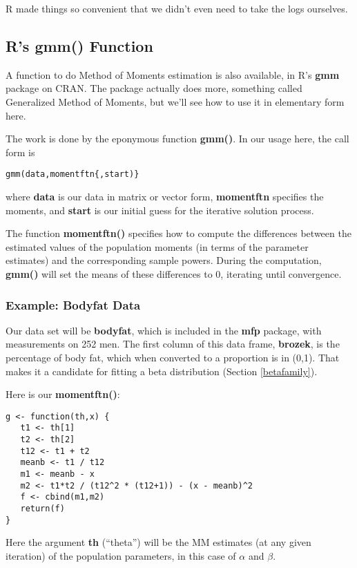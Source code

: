 R made things so convenient that we didn't even need to take the logs
ourselves.

\subsection{R's gmm() Function}

A function to do Method of Moments estimation is also available, in R's
{\bf gmm} package on CRAN.  The package actually does more, something
called Generalized Method of Moments, but we'll see how to use it in
elementary form here.

The work is done by the eponymous function {\bf gmm()}.  In our usage
here, the call form is

\begin{lstlisting}
gmm(data,momentftn{,start)}
\end{lstlisting}

where {\bf data} is our data in matrix or vector form, {\bf momentftn}
specifies the moments, and {\bf start} is our initial guess for the
iterative solution process.

The function {\bf momentftn()} specifies how to compute the differences
between the estimated values of the population moments (in terms of the
parameter estimates) and the corresponding sample powers. During the
computation, {\bf gmm()} will set the means of these differences to 0,
iterating until convergence.

\subsubsection{Example:  Bodyfat Data}

Our data set will be {\bf bodyfat}, which is included in the {\bf mfp}
package, with measurements on 252 men. The first column of this data
frame, {\bf brozek}, is the percentage of body fat, which when converted
to a proportion is in (0,1). That makes it a candidate for fitting a
beta distribution (Section \ref{betafamily}).

Here is our {\bf momentftn()}:

\begin{lstlisting}
g <- function(th,x) {
   t1 <- th[1]
   t2 <- th[2]
   t12 <- t1 + t2
   meanb <- t1 / t12
   m1 <- meanb - x
   m2 <- t1*t2 / (t12^2 * (t12+1)) - (x - meanb)^2
   f <- cbind(m1,m2)
   return(f)
}
\end{lstlisting}

Here the argument {\bf th} (“theta”) will be the MM estimates (at any
given iteration) of the population parameters, in this case of 
$\alpha$ and $\beta$.  

